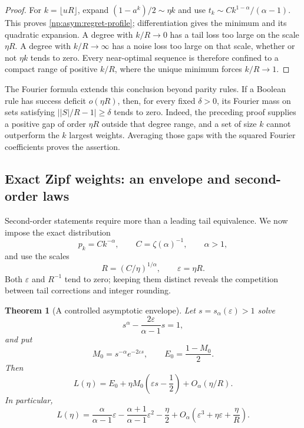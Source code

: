 \documentclass[11pt,a4paper]{article}
\newtheorem{theorem}{Theorem}[section]
\theoremstyle{definition}
\theoremstyle{remark}
\begin{document}
\begin{proof}
For $k=\lfloor uR\rfloor$, expand
$(1-a^k)/2\sim\eta k$ and use
$t_k\sim Ck^{1-\alpha}/(\alpha-1)$.
This proves \eqref{np:asym:regret-profile}; differentiation gives the
minimum and its quadratic expansion.  A degree with $k/R\to0$ has a
tail loss too large on the scale $\eta R$.  A degree with $k/R\to\infty$
has a noise loss too large on that scale, whether or not $\eta k$ tends
to zero.  Every near-optimal sequence is therefore confined to a compact
range of positive $k/R$, where the unique minimum forces $k/R\to1$.
\end{proof}

The Fourier formula extends this conclusion beyond parity rules.
If a Boolean rule has success deficit $o(\eta R)$, then, for every fixed
$\delta>0$, its Fourier mass on sets satisfying
$\lvert |S|/R-1\rvert\geq\delta$ tends to zero.
Indeed, the preceding proof supplies a positive gap of order $\eta R$
outside that degree range, and a set of size $k$ cannot outperform the
$k$ largest weights.  Averaging those gaps with the squared Fourier
coefficients proves the assertion.

\subsection{Exact Zipf weights: an envelope and second-order laws}
\label{np:asym:zipf}

Second-order statements require more than a leading tail equivalence.
We now impose the exact distribution
\[
 p_k=Ck^{-\alpha},\qquad C=\zeta(\alpha)^{-1},\qquad\alpha>1,
\]
and use the scales
\begin{equation}
 R=(C/\eta)^{1/\alpha},\qquad \varepsilon=\eta R.
 \label{np:asym:zipf-scales}
\end{equation}
Both $\varepsilon$ and $R^{-1}$ tend to zero; keeping them distinct
reveals the competition between tail corrections and integer rounding.

\begin{theorem}[A controlled asymptotic envelope]
\label{np:asym:zipf-envelope}
Let $s=s_\alpha(\varepsilon)>1$ solve
\begin{equation}
 s^\alpha-\frac{2\varepsilon}{\alpha-1}s=1,
 \label{np:asym:saddle-equation}
\end{equation}
and put
\begin{equation}
 M_0=s^{-\alpha}e^{-2\varepsilon s},\qquad E_0=\frac{1-M_0}{2}.
 \label{np:asym:envelope-definitions}
\end{equation}
Then
\begin{equation}
 L(\eta)=E_0+\eta M_0\left(\varepsilon s-\frac12\right)
                     +O_\alpha(\eta/R).
 \label{np:asym:envelope}
\end{equation}
In particular,
\begin{equation}
 L(\eta)=\frac{\alpha}{\alpha-1}\varepsilon
       -\frac{\alpha+1}{\alpha-1}\varepsilon^2-\frac\eta2
       +O_\alpha\!\left(\varepsilon^3+\eta\varepsilon+\frac\eta R\right).
 \label{np:asym:zipf-second-order}
\end{equation}
\end{theorem}
\end{document}
